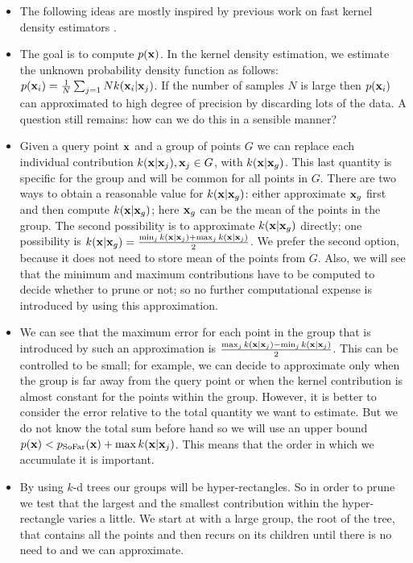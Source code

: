 \begin{itemize}
	\item The following ideas are mostly inspired by previous work on fast kernel
density estimators \citep{gray2003,shen2006}.
	\item The goal is to compute $p(\mathbf{x})$. In the kernel density estimation, we
estimate the unknown probability density function as follows: $p(\mathbf{x}_i) =
\frac{1}{N}\sum_{j=1} Nk(\mathbf{x}_i|\mathbf{x}_j)$. If the number of samples $N$ is large
then $p(\mathbf{x}_i)$ can approximated to high degree of precision by discarding lots
of the data. A question still remains: how can we do this in a sensible manner? 
	\item Given a query point $\mathbf{x}$ and a group of points $G$ we can replace each
individual contribution $k(\mathbf{x}|\mathbf{x}_j), \mathbf{x}_j\in G$, with $k(\mathbf{x}|\mathbf{x}_g)$. This
last quantity is specific for the group and will be common for all points in
$G$. There are two ways to obtain a reasonable value for $k(\mathbf{x}|\mathbf{x}_g)$: either
approximate $\mathbf{x}_g$ first and then compute $k(\mathbf{x}|\mathbf{x}_g)$; here $\mathbf{x}_g$ can be
the mean of the points in the group. The second possibility is to approximate
$k(\mathbf{x}|\mathbf{x}_g)$ directly; one possibility is $k(\mathbf{x}|\mathbf{x}_g) =
\frac{\min_jk(\mathbf{x}|\mathbf{x}_j) + \max_jk(\mathbf{x}|\mathbf{x}_j)}{2}$. We prefer the second option,
because it does not need to store mean of the points from $G$. Also, we will see
that the minimum and maximum contributions have to be computed to decide whether
to prune or not; so no further computational expense is introduced by using this
approximation.
	\item We can see that the maximum error for each point in the group that is
introduced by such an approximation is $\frac{\max_jk(\mathbf{x}|\mathbf{x}_j) -
\min_jk(\mathbf{x}|\mathbf{x}_j)}{2}$. This can be controlled to be small; for example, we can
decide to approximate only when the group is far away from the query point or
when the kernel contribution is almost constant for the points within the group.
However, it is better to consider the error relative to the total quantity we
want to estimate. But we do not know the total sum before hand so we will use an
upper bound $p(\mathbf{x}) < p_{\text{SoFar}}(\mathbf{x}) + \max k(\mathbf{x}|\mathbf{x}_j) $. This means
that the order in which we accumulate it is important. 
	\item By using $k$-d trees our groups will be hyper-rectangles. So in order to
prune we test that the largest and the smallest contribution within the
hyper-rectangle varies a little. We start at with a large group, the root of the
tree, that contains all the points and then recurs on its children until there
is no need to and we can approximate. 
\end{itemize}

